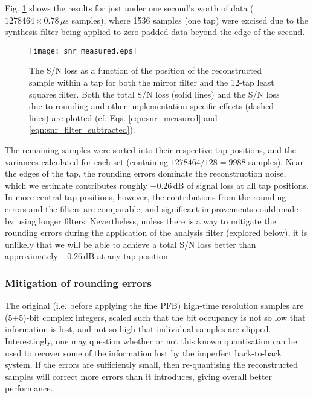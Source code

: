 \documentclass{pasa}%
\begin{document}
Fig. \ref{fig:snr_measured} shows the results for just under one second's worth of data ($1278464 \times 0.78\,\mu$s samples), where 1536 samples (one tap) were excised due to the synthesis filter being applied to zero-padded data beyond the edge of the second.
\begin{figure}
    \centering
    \texttt{[image: snr\_measured.eps]}
    \caption{The S/N loss as a function of the position of the reconstructed sample within a tap for both the mirror filter and the 12-tap least squares filter. Both the total S/N loss (solid lines) and the S/N loss due to rounding and other implementation-specific effects (dashed lines) are plotted (cf. Eqs. \eqref{eqn:snr_measured} and \eqref{eqn:snr_filter_subtracted}).}
    \label{fig:snr_measured}
\end{figure}
The remaining samples were sorted into their respective tap positions, and the variances calculated for each set (containing $1278464/128 = 9988$ samples).
Near the edges of the tap, the rounding errors dominate the reconstruction noise, which we estimate contributes roughly $-0.26\,$dB of signal loss at all tap positions.
In more central tap positions, however, the contributions from the rounding errors and the filters are comparable, and significant improvements could made by using longer filters.
Nevertheless, unless there is a way to mitigate the rounding errors during the application of the analysis filter (explored below), it is unlikely that we will be able to achieve a total S/N loss better than approximately $-0.26\,$dB at any tap position.

\subsubsection*{Mitigation of rounding errors}

The original (i.e. before applying the fine PFB) high-time resolution samples are (5+5)-bit complex integers, scaled such that the bit occupancy is not so low that information is lost, and not so high that individual samples are clipped.
Interestingly, one may question whether or not this known quantisation can be used to recover some of the information lost by the imperfect back-to-back system.
If the errors are sufficiently small, then re-quantising the reconstructed samples will correct more errors than it introduces, giving overall better performance.
\end{document}
